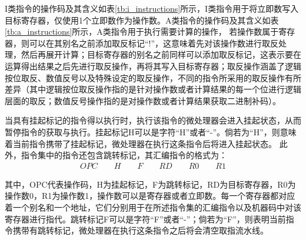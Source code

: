 I类指令的操作码及其含义如表\ref{tb:i_instructions}所示，I类指令用于将立即数写入目标寄存器，仅使用1个立即数作为操作数。A类指令的操作码及其含义如表\ref{tb:a_instructions}所示，A类指令用于执行需要计算的操作，
若操作数属于寄存器，则可以在其别名之前添加取反标记“!”，这意味着先对该操作数进行取反处理，然后再展开计算；目标寄存器的别名之前同样可以添加取反标记，这表示要在运算得出结果之后先进行取反操作，再将其写入目标寄存器；取反操作涵盖了逻辑按位取反、数值反号以及特殊设定的取反操作，不同的指令所采用的取反操作有所差异（其中逻辑按位取反操作指的是针对操作数或者计算结果的每一个位进行逻辑层面的取反；数值反号操作指的是对操作数或者计算结果获取二进制补码）。


当具有挂起标记的指令得以执行时，执行该指令的微处理器会进入挂起状态，从而暂停指令的获取与执行。挂起标记H可以是字符“H”或者“-”。倘若为“H”，则意味着当前指令携带了挂起标记，微处理器在执行这条指令后将进入挂起状态。
此外，指令集中的指令还包含跳转标记，其汇编指令的格式为：
\begin{align}
    OPC \qquad H \qquad F \qquad RD \qquad R0 \qquad R1
\end{align}


其中，OPC代表操作码，H为挂起标记，F为跳转标记，RD为目标寄存器，R0为操作数0，R1为操作数1，操作数可以是寄存器或者立即数。每一个寄存器都对应着一个别名和一个地址，它们分别用于在所述指令集的汇编指令以及机器码中对该寄存器进行指代。跳转标记F可以是字符“F”或者“-”；倘若为“F”，则表明当前指令携带有跳转标记，微处理器在执行这条指令之后将会清空取指流水线。


